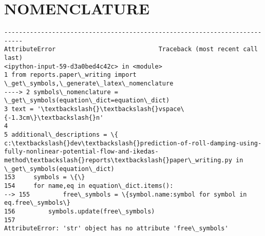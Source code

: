 \section*{NOMENCLATURE}\label{nomenclature}
\begin{Verbatim}[commandchars=\\\{\}]
---------------------------------------------------------------------------
AttributeError                            Traceback (most recent call last)
<ipython-input-59-d3a0bed4c42c> in <module>
1 from reports.paper\_writing import \_get\_symbols,\_generate\_latex\_nomenclature
----> 2 symbols\_nomenclature = \_get\_symbols(equation\_dict=equation\_dict)
3 text = '\textbackslash{}\textbackslash{}vspace\{-1.3cm\}\textbackslash{}n'
4
5 additional\_descriptions = \{
c:\textbackslash{}dev\textbackslash{}prediction-of-roll-damping-using-fully-nonlinear-potential-flow-and-ikedas-method\textbackslash{}reports\textbackslash{}paper\_writing.py in \_get\_symbols(equation\_dict)
153     symbols = \{\}
154     for name,eq in equation\_dict.items():
--> 155         free\_symbols = \{symbol.name:symbol for symbol in eq.free\_symbols\}
156         symbols.update(free\_symbols)
157
AttributeError: 'str' object has no attribute 'free\_symbols'
\end{Verbatim}
